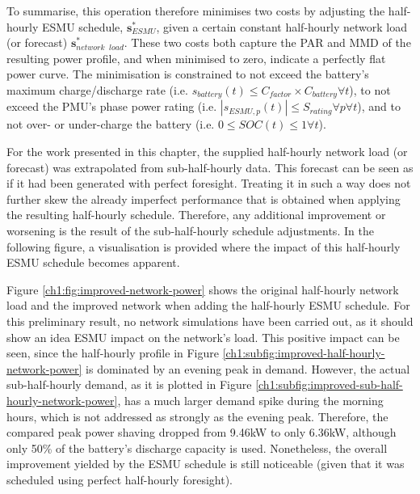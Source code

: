

To summarise, this operation therefore minimises two costs by adjusting the half-hourly ESMU schedule, $\textbf{s}^*_{ESMU}$, given a certain constant half-hourly network load (or forecast) $\textbf{s}^*_{network\;\;load}$.
These two costs both capture the PAR and MMD of the resulting power profile, and when minimised to zero, indicate a perfectly flat power curve.
The minimisation is constrained to not exceed the battery's maximum charge/discharge rate (i.e. $s_{battery}(t) \leq C_{factor} \times C_{battery} \forall t$), to not exceed the PMU's phase power rating (i.e. $\left|s_{ESMU,p}(t)\right| \leq S_{rating} \forall p \forall t$), and to not over- or under-charge the battery (i.e. $0 \leq SOC(t) \leq 1 \forall t$).

For the work presented in this chapter, the supplied half-hourly network load (or forecast) was extrapolated from sub-half-hourly data.
This forecast can be seen as if it had been generated with perfect foresight.
Treating it in such a way does not further skew the already imperfect performance that is obtained when applying the resulting half-hourly schedule.
Therefore, any additional improvement or worsening is the result of the sub-half-hourly schedule adjustments.
In the following figure, a visualisation is provided where the impact of this half-hourly ESMU schedule becomes apparent.



Figure \ref{ch1:fig:improved-network-power} shows the original half-hourly network load and the improved network when adding the half-hourly ESMU schedule.
For this preliminary result, no network simulations have been carried out, as it should show an idea ESMU impact on the network's load.
This positive impact can be seen, since the half-hourly profile in Figure \ref{ch1:subfig:improved-half-hourly-network-power} is dominated by an evening peak in demand.
However, the actual sub-half-hourly demand, as it is plotted in Figure \ref{ch1:subfig:improved-sub-half-hourly-network-power}, has a much larger demand spike during the morning hours, which is not addressed as strongly as the evening peak.
Therefore, the compared peak power shaving dropped from 9.46kW to only 6.36kW, although only 50\% of the battery's discharge capacity is used.
Nonetheless, the overall improvement yielded by the ESMU schedule is still noticeable (given that it was scheduled using perfect half-hourly foresight). 

